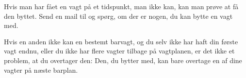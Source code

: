 Hvis man har fået en vagt på et tidspunkt, man ikke kan, kan man prøve
at få den byttet. Send en mail til  og
spørg, om der er nogen, du kan bytte en vagt med.

Hvis en anden ikke kan en bestemt barvagt, og du selv ikke har haft
din første vagt endnu, eller du ikke har flere vagter tilbage på
vagtplanen, er det ikke et problem, at du overtager den: Den, du
bytter med, kan bare overtage en af dine vagter på næste barplan.



